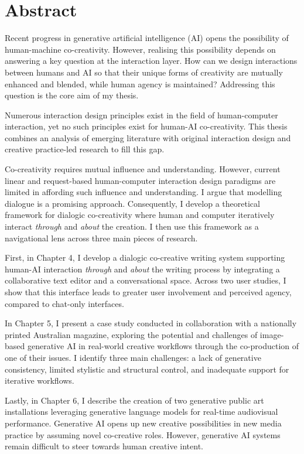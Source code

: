 \chapter{Abstract}

Recent progress in generative artificial intelligence (AI) opens the possibility of human-machine co-creativity. However, realising this possibility depends on answering a key question at the interaction layer. How can we design interactions between humans and AI so that their unique forms of creativity are mutually enhanced and blended, while human agency is maintained? Addressing this question is the core aim of my thesis. 

Numerous interaction design principles exist in the field of human-computer interaction, yet no such principles exist for human-AI co-creativity. This thesis combines an analysis of emerging literature with original interaction design and creative practice-led research to fill this gap. 

Co-creativity requires mutual influence and understanding. However, current linear and request-based human-computer interaction design paradigms are limited in affording such influence and understanding. I argue that modelling dialogue is a promising approach. Consequently, I develop a theoretical framework for dialogic co-creativity where human and computer iteratively interact \textit{through} and \textit{about} the creation. I then use this framework as a navigational lens across three main pieces of research.

First, in Chapter 4, I develop a dialogic co-creative writing system supporting human-AI interaction \textit{through} and \textit{about} the writing process by integrating a collaborative text editor and a conversational space. Across two user studies, I show that this interface leads to greater user involvement and perceived agency, compared to chat-only interfaces.

In Chapter 5, I present a case study conducted in collaboration with a nationally printed Australian magazine, exploring the potential and challenges of image-based generative AI in real-world creative workflows through the co-production of one of their issues. I identify three main challenges: a lack of generative consistency, limited stylistic and structural control, and inadequate support for iterative workflows.

Lastly, in Chapter 6, I describe the creation of two generative public art installations leveraging generative language models for real-time audiovisual performance. Generative AI opens up new creative possibilities in new media practice by assuming novel co-creative roles. However, generative AI systems remain difficult to steer towards human creative intent.

